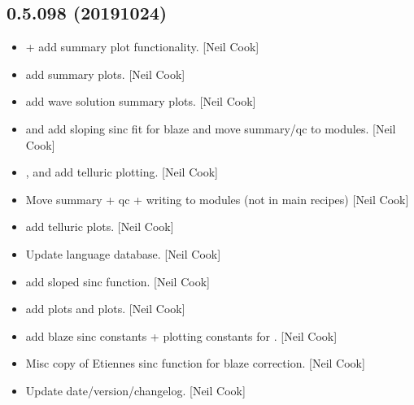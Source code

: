 \documentclass[a4paper,10pt,english]{report}
\begin{document}
\subsection{0.5.098 (2019\sphinxhyphen{}10\sphinxhyphen{}24)}
\label{\detokenize{misc/changelog:id64}}\begin{itemize}
\item {} 
 +  \sphinxhyphen{} add summary
plot functionality. {[}Neil Cook{]}

\item {} 
 \sphinxhyphen{} add summary plots. {[}Neil Cook{]}

\item {} 
 \sphinxhyphen{} add wave solution
summary plots. {[}Neil Cook{]}

\item {} 
 and  \sphinxhyphen{} add sloping sinc fit for blaze and
move summary/qc to modules. {[}Neil Cook{]}

\item {} 
,  and  \sphinxhyphen{}
add telluric plotting. {[}Neil Cook{]}

\item {} 
Move summary + qc + writing to modules (not in main recipes) {[}Neil
Cook{]}

\item {} 
 \sphinxhyphen{} add telluric plots. {[}Neil Cook{]}

\item {} 
Update language database. {[}Neil Cook{]}

\item {} 
 \sphinxhyphen{} add sloped sinc function. {[}Neil Cook{]}

\item {} 
 \sphinxhyphen{} add  plots
and  plots. {[}Neil Cook{]}

\item {} 
 \sphinxhyphen{} add blaze sinc constants + plotting
constants for . {[}Neil Cook{]}

\item {} 
Misc \sphinxhyphen{} copy of Etiennes sinc function for blaze correction. {[}Neil
Cook{]}

\item {} 
Update date/version/changelog. {[}Neil Cook{]}

\end{itemize}
\end{document}
